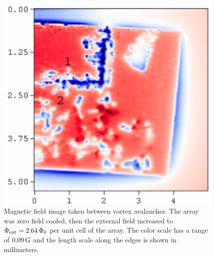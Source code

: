 \begin{figure}[p]
\includegraphics[width=5.7in]{figs/prospective/fig2_b_lg.ps}
\caption[Magnetic field images taken between vortex avalanches, at
$\Phiext = 2.64\,\Phinot$ per unit cell of the array.]
{Magnetic field image taken between vortex avalanches. The
array was zero field cooled, then the external field increased
to  $\Phiext = 2.64\,\Phinot$ per unit cell of the array. 
The color scale has a range of
$0.09\,\mathrm{G}$ and the length scale along the edges is shown in 
millimeters.
}
\label{fig:small_avalanche_steps_b}
\end{figure} 

